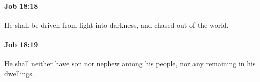 		\paragraph{Job 18:18} %
			\label{JOB-18-18}

			He shall be driven from light into darkness, and chased out of the world.


		\paragraph{Job 18:19} %
			\label{JOB-18-19}

			He shall neither have son nor nephew among his people, nor any remaining in his dwellings.


